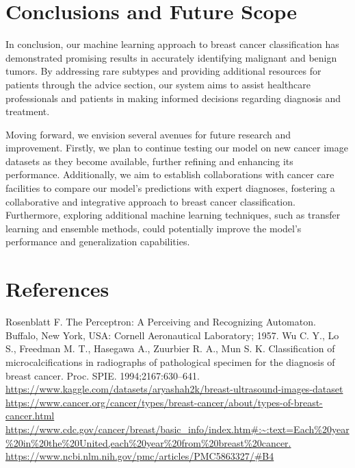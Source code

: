 \documentclass{article}
\begin{document}
\section{Conclusions and Future Scope}
In conclusion, our machine learning approach to breast cancer classification has demonstrated promising results in accurately identifying malignant and benign tumors. By addressing rare subtypes and providing additional resources for patients through the advice section, our system aims to assist healthcare professionals and patients in making informed decisions regarding diagnosis and treatment.

Moving forward, we envision several avenues for future research and improvement. Firstly, we plan to continue testing our model on new cancer image datasets as they become available, further refining and enhancing its performance. Additionally, we aim to establish collaborations with cancer care facilities to compare our model's predictions with expert diagnoses, fostering a collaborative and integrative approach to breast cancer classification. Furthermore, exploring additional machine learning techniques, such as transfer learning and ensemble methods, could potentially improve the model's performance and generalization capabilities.

\section{References}
Rosenblatt F. The Perceptron: A Perceiving and Recognizing Automaton. Buffalo, New York, USA: Cornell Aeronautical Laboratory; 1957.
Wu C. Y., Lo S., Freedman M. T., Hasegawa A., Zuurbier R. A., Mun S. K. Classification of microcalcifications in radiographs of pathological specimen for the diagnosis of breast cancer. Proc. SPIE. 1994;2167:630–641.
\url{https://www.kaggle.com/datasets/aryashah2k/breast-ultrasound-images-dataset}
\url{https://www.cancer.org/cancer/types/breast-cancer/about/types-of-breast-cancer.html}
\url{https://www.cdc.gov/cancer/breast/basic_info/index.htm#:~:text=Each%20year%20in%20the%20United,each%20year%20from%20breast%20cancer.}
\url{https://www.ncbi.nlm.nih.gov/pmc/articles/PMC5863327/#B4}
\end{document}
